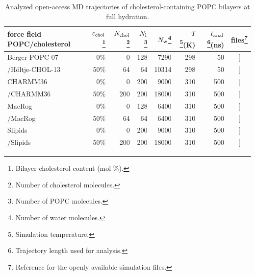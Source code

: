 \documentclass[journal=jcisd8,manuscript=article,layout=twocolumn]{achemso}
\begin{document}
\begin{table}[]
\caption{Analyzed open-access MD trajectories of cholesterol-containing POPC bilayers at full hydration.}
\begin{minipage}[t]{\columnwidth}
\resizebox{\columnwidth}{!} {
\begin{tabular}{lrrrrrrc}
force field POPC/cholesterol &
$c_{{\rm chol}}$\footnote{Bilayer cholesterol content (mol \%).}  &
$N_{\rm chol}$\footnote{Number of cholesterol molecules.}  &
$N_{\rm l}$\footnote{Number of POPC molecules.} &
$N_{\rm w}$\footnote{Number of water molecules.}  &
$T$\footnote{Simulation temperature.}(K) &
$t_{{\rm anal}}$\footnote{Trajectory length used for analysis.}(ns) &
files\footnote{Reference for the openly available simulation files.} 
\tabularnewline
\hline 
Berger-POPC-07~\cite{ollila07a}
	& 0\%	& 0	& 128	& 7290  & 298  & 50 & {[}\!\!\citenum{bergerFILESpopc}{]} \tabularnewline
/H\"{o}ltje-CHOL-13~\cite{holtje01,ferreira13} 
	& 50\%	& 64	& 64		& 10314  & 298  & 50  & {[}\!\!\citenum{bergerFILESpopc50chol}{]} \tabularnewline[1.0ex]
CHARMM36~\cite{klauda10} 
	& 0\%	& 0 	& 200 	& 9000  & 310  & 500  & {[}\!\!\citenum{T310charmm36files}{]} \tabularnewline
/CHARMM36~\cite{lim12} 
 	& 50\%	& 200	& 200		& 18000  & 310  & 500  & {[}\!\!\citenum{T310charmm36files50perCHOL}{]} \tabularnewline[1.0ex]
MacRog~\cite{kulig15}
	& 0\%	& 0	& 128	& 6400  & 310  & 500  & {[}\!\!\citenum{macrogCHOLfiles}{]} \tabularnewline
/MacRog~\cite{kulig15}
 	& 50\%	& 64	& 64		& 6400  & 310  & 500  & {[}\!\!\citenum{macrogCHOLfiles}{]} \tabularnewline[1.0ex]
Slipids~\cite{jambeck12b}
	& 0\%	& 0	& 200	& 9000 & 310 & 500  & {[}\!\!\citenum{slipidsFILESpopcchol}{]} \tabularnewline
/Slipids~\cite{jambeck13chol}
 	& 50\%	&200& 200	& 18000 & 310 & 500 & {[}\!\!\citenum{slipidsFILESpopcchol}{]}\tabularnewline
\end{tabular}
}
\end{minipage}
\label{tab:chol}
\end{table}
\end{document}
